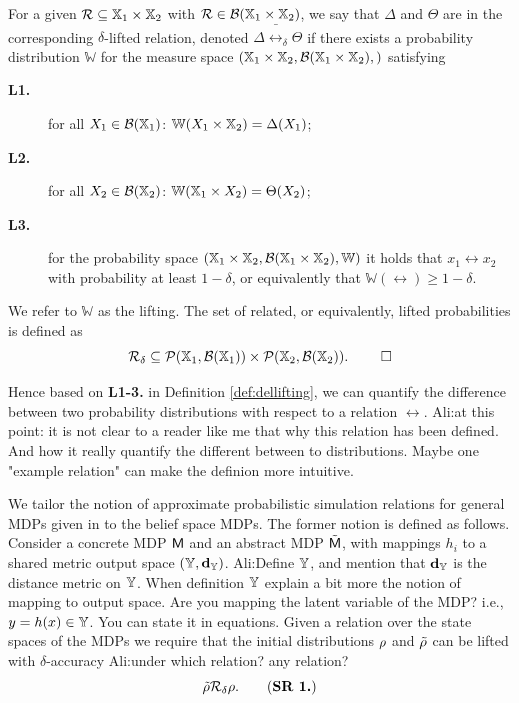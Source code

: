 \documentclass{ifacconf}
\renewcommand{\axx}[1]{{\color{orange} Ali:#1}}
\begin{document}
\begin{definition}\label{def:dellifting}
For a given 
	$\mathcal{R}\subseteq {\mathbb{X}}_1\times {\mathbb{X}}_2$ with $\mathcal{R}\in \mathcal B({\mathbb{X}}_1\times {\mathbb{X}}_2)$, we say that  $\Delta$ and $ \Theta$ are in the corresponding $\delta$-lifted relation, denoted $\Delta \bar \rel_\delta \Theta$  if there exists a probability distribution $\mathbb W$ for the measure space $({\mathbb{X}}_1\times {\mathbb{X}}_2,\mathcal B({\mathbb{X}}_1\times {\mathbb{X}}_2),)$
	satisfying { \setlength{\parskip}{-1pt}\setlength{\parsep}{0pt}
		\begin{description}
			\item[\textbf{L1.}] for all $X_1\in \mathcal{B}({\mathbb{X}}_1)$: $\mathbb W(X_1\times {\mathbb{X}}_2)=\Delta(X_1)$;
			\item [\textbf{L2.}] for all $X_2\in \mathcal{B}({\mathbb{X}}_2)$:  $\mathbb W({\mathbb{X}}_1\times X_2)=\Theta(X_2)$;
			\item[\textbf{L3.}] for the probability space  $({\mathbb{X}}_1\times {\mathbb{X}}_2,\mathcal B({\mathbb{X}}_1\times {\mathbb{X}}_2), \mathbb W)$ it holds that
			$x_1\rel x_2$ with probability at least $1-\delta$, or equivalently that $\mathbb{W}\left(\rel\right)\geq1-\delta$.
	\end{description}}%
	
We refer to  $\mathbb W$ as the lifting. %
The set of related, or equivalently, lifted probabilities is defined as 
	\[\bar\rel_\delta\subseteq \mathcal{P}(\X_1,\mathcal B(\X_1))\times \mathcal{P}(\X_2,\mathcal B(\X_2)). \hfill \mbox{ }\qed\] 

\end{definition}

Hence based on \textbf{L1-3.} in Definition \ref{def:dellifting}, we can quantify the difference between two probability distributions with respect to a relation $\rel$.
\axx{at this point: it is not clear to a reader like me that why this relation has been defined. And how it really quantify the different between to distributions. Maybe one "example relation" can make the definion more intuitive.}
 
We tailor the notion of approximate probabilistic simulation relations for general MDPs given in \citep{haesaert2017verification} to the belief space MDPs.
  The former notion is defined as follows. 
Consider a concrete MDP $\mathsf{M}$ and an abstract  MDP $\tilde{\mathsf{M}}$, with mappings $h_i$ to a shared {metric} output space  $({\mathbb{Y}},\mathbf{d}_{\mathbb{Y}})$. \axx{Define ${\mathbb{Y}}$, and mention that $\mathbf{d}_{\mathbb{Y}}$ is the distance metric on ${\mathbb{Y}}$. When definition ${\mathbb{Y}}$ explain a bit more the notion of mapping to output space. Are you mapping the latent variable of the MDP? i.e., $y=h(x)\in{\mathbb{Y}}$. You can state it in equations.} 
Given a relation over the state spaces of the MDPs we require that the initial distributions $\rho$ and $\tilde{\rho}$ can be lifted with $\delta$-accuracy \axx{under which relation? any relation?}
\begin{equation}
\tilde\init \bar \rel_\delta \init.
	\tag{\textbf{SR 1.}}
\end{equation}
  
\end{document}
